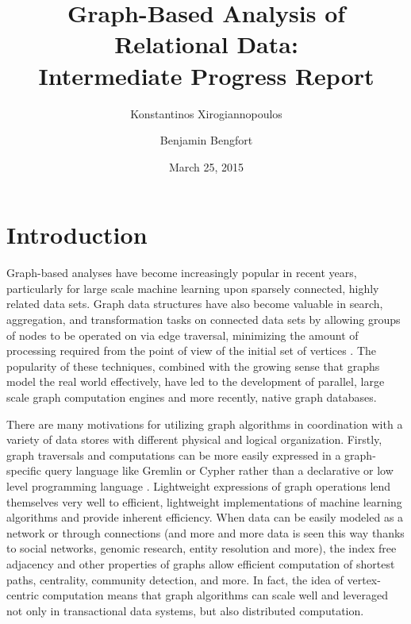 \documentclass[11pt,letterpaper]{article}
\begin{document}
\title{Graph-Based Analysis of Relational Data:\\Intermediate Progress Report}

\author[ ]{Konstantinos Xirogiannopoulos}
\author[ ]{Benjamin Bengfort}

\date{March 25, 2015}

\maketitle


\section*{Introduction}

Graph-based analyses have become increasingly popular in recent years, particularly for large scale machine learning upon sparsely connected, highly related data sets. Graph data structures have also become valuable in search, aggregation, and transformation tasks on connected data sets by allowing groups of nodes to be operated on via edge traversal, minimizing the amount of processing required from the point of view of the initial set of vertices \cite{berretti_efficient_2001}. The popularity of these techniques, combined with the growing sense that graphs model the real world effectively, have led to the development of parallel, large scale graph computation  engines and more recently, native graph databases.

There are many motivations for utilizing graph algorithms in coordination with a variety of data stores with different physical and logical organization. Firstly, graph traversals and computations can be more easily expressed in a graph-specific query language like Gremlin \cite{rodriguez_gremlin_2013} or Cypher \cite{miller_graph_2013} rather than a declarative or low level programming language \cite{rodriguez_exploring_2012}. Lightweight expressions of graph operations lend themselves very well to efficient, lightweight implementations of machine learning algorithms and provide inherent efficiency. When data can be easily modeled as a network or through connections (and more and more data is seen this way thanks to social networks, genomic research, entity resolution and more), the index free adjacency and other properties of graphs allow efficient computation of shortest paths, centrality, community detection, and more. In fact, the idea of vertex-centric computation \cite{malewicz_pregel:_2010} means that graph algorithms can scale well and leveraged not only in transactional data systems, but also distributed computation.
\end{document}
